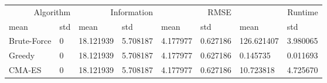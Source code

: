 \begin{tabular}{llllllll}
\toprule
\multicolumn{2}{r}{Algorithm} & \multicolumn{2}{r}{Information} & \multicolumn{2}{r}{RMSE} & \multicolumn{2}{r}{Runtime} \\
mean & std & mean & std & mean & std & mean & std \\
\midrule
Brute-Force & 0 & 18.121939 & 5.708187 & 4.177977 & 0.627186 & 126.621407 & 3.980065 \\
Greedy & 0 & 18.121939 & 5.708187 & 4.177977 & 0.627186 & 0.145735 & 0.011693 \\
CMA-ES & 0 & 18.121939 & 5.708187 & 4.177977 & 0.627186 & 10.723818 & 4.725670 \\
\bottomrule
\end{tabular}
